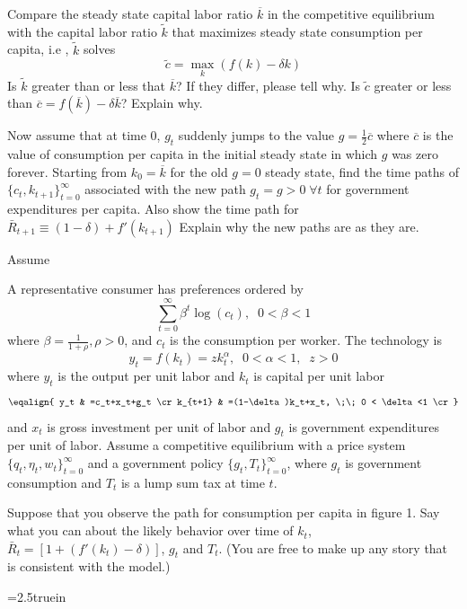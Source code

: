  Compare the steady state capital labor ratio $\overline{k}$ in the competitive equilibrium with the capital labor ratio $\tilde{k}$ that maximizes steady state consumption per capita, i.e ,
 $\tilde{k}$ solves $$\tilde{c}=\max_k \left( f(k)-\delta k \right) $$
Is $\tilde{k}$ greater than or less that $\overline{k}$? If they differ, please tell why. Is $\tilde{c}$ greater or less than $\overline{c} = f(\overline{k})-\delta  \overline{k}$? Explain why.
\medskip

 Now assume that at time 0, $g_t$ suddenly jumps to the value $g={\frac{1}{2}}\overline{c}$ where
$\overline{c}$ is the value of consumption per capita in the initial steady state in which $g$ was zero forever. Starting from $k_0 = \overline{k}$ for the old $g=0$ steady state, find the time paths of $\{c_t,k_{t+1}\}_{t=0}^\infty$ associated with the new path $g_t=g>0 \; \forall t$ for government expenditures per capita.
Also show the time path for $\bar R_{t+1} \equiv (1-\delta) + f'(k_{t+1})$
Explain why the new paths are as they are.



\medskip
{}
\medskip
\noindent
 Assume 
 
 A representative consumer has preferences ordered by
 $$ \sum_{t=0}^\infty \beta^t \log(c_t), \;\;  0< \beta<1$$
 where $\beta = {\frac{1}{1+\rho}}, \rho>0$, and $c_t$ is the consumption per worker.
The technology is $$ y_t=f(k_t)=zk_t^\alpha, \;\; 0<\alpha<1, \;\; z>0 $$
where $y_t$ is the output per unit labor and $k_t$ is capital per unit labor
$$\eqalign{
y_t & =c_t+x_t+g_t \cr
  k_{t+1} & =(1-\delta)k_t+x_t, \;\;  0 < \delta<1 \cr
}$$
and $x_t$ is  gross investment per unit of labor and $g_t$ is  government expenditures per unit of labor.
Assume a competitive equilibrium with a price system $\{q_t,\eta_t,w_t\}_{t=0}^\infty$ and a government policy $\{g_t,T_t\}_{t=0}^\infty$, where
$g_t$ is government consumption and $T_t$ is a lump sum tax at time $t$.

 
Suppose that you observe the path for consumption per capita in figure 1. Say what you can about the likely behavior over time of $k_t$, $\bar R_t =[1 + (f'(k_t)-\delta)]$, $g_t$ and $T_t$. (You are free to make up any story that is consistent with the model.)

\medskip


\centerline{\epsfxsize=2.5truein}
\caption{Consumption per capita.}
\endfigure




